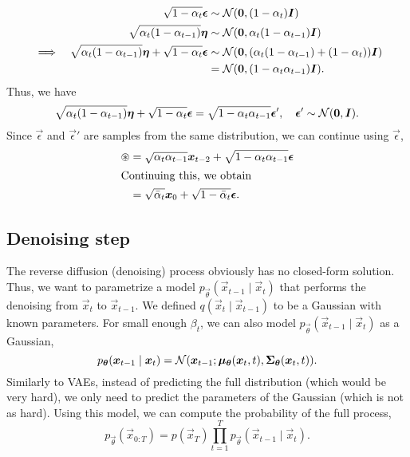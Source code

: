 \begin{align*}
     &          & \sqrt{1-\alpha_t} \vec{\epsilon}                                                 & \sim \mathcal{N}(\vec{0}, (1 - \alpha_t) \mat{I})                                \\
     &          & \sqrt{\alpha_t (1 - \alpha_{t-1})} \vec{\eta}                                    & \sim \mathcal{N}(\vec{0}, \alpha_t(1 - \alpha_{t-1}) \mat{I})                    \\
     & \implies & \sqrt{\alpha_t (1 - \alpha_{t-1})} \vec{\eta} + \sqrt{1-\alpha_t} \vec{\epsilon} & \sim \mathcal{N}(\vec{0}, (\alpha_t(1 - \alpha_{t-1}) + (1 - \alpha_t)) \mat{I}) \\
     &          &                                                                                  & = \mathcal{N}(\vec{0}, (1 - \alpha_t \alpha_{t-1}) \mat{I}).
\end{align*}
Thus, we have \[
    \sqrt{\alpha_t (1-\alpha_{t-1})} \vec{\eta} + \sqrt{1 - \alpha_t} \vec{\epsilon} = \sqrt{1 - \alpha_t\alpha_{t-1}} \vec{\epsilon}', \quad \vec{\epsilon}' \sim \mathcal{N}(\vec{0}, \mat{I}).
\]
Since $\vec{\epsilon}$ and $\vec{\epsilon}'$ are samples from the same distribution, we can
continue using $\vec{\epsilon}$,
\begin{align*}
    \circledast & = \sqrt{\alpha_t \alpha_{t-1}} \vec{x}_{t-2} + \sqrt{1 - \alpha_t\alpha_{t-1}} \vec{\epsilon} \\
    \intertext{Continuing this, we obtain}
                & = \sqrt{\bar{\alpha}_t} \vec{x}_0 + \sqrt{1 - \bar{\alpha}_t} \vec{\epsilon}.
\end{align*}

\subsection{Denoising step}

The reverse diffusion (denoising) process obviously has no closed-form solution. Thus, we want to
parametrize a model $p_{\vec{\theta}}(\vec{x}_{t-1} \mid \vec{x}_t)$ that performs the denoising
from $\vec{x}_t$ to $\vec{x}_{t-1}$. We defined $q(\vec{x}_t \mid \vec{x}_{t-1})$ to be a Gaussian
with known parameters. For small enough $\beta_t$, we can also model
$p_{\vec{\theta}}(\vec{x}_{t-1} \mid \vec{x}_t)$ as a Gaussian, \[
    p_{\vec{\theta}}(\vec{x}_{t-1} \mid \vec{x}_t) = \mathcal{N}(\vec{x}_{t-1} ; \vec{\mu}_{\vec{\theta}}(\vec{x}_t, t), \mat{\Sigma}_{\vec{\theta}}(\vec{x}_t, t)).
\]
Similarly to VAEs, instead of predicting the full distribution (which would be very hard), we only
need to predict the parameters of the Gaussian (which is not as hard). Using this model, we can
compute the probability of the full process, \[
    p_{\vec{\theta}}(\vec{x}_{0:T}) = p(\vec{x}_T) \prod_{t=1}^{T} p_{\vec{\theta}}(\vec{x}_{t-1} \mid \vec{x}_t).
\]


